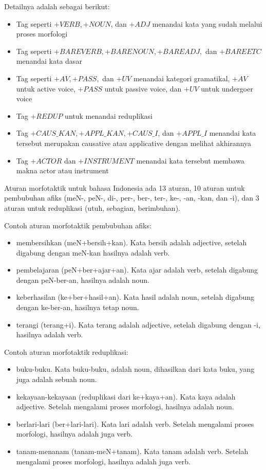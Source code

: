 Detailnya adalah sebagai berikut:
	\begin{itemize}
		\item Tag seperti $+VERB, +NOUN$, dan $+ADJ$ menandai kata yang sudah melalui proses morfologi
		\item Tag seperti $+BAREVERB, +BARENOUN, +BAREADJ,$ dan $+BAREETC$ menandai kata dasar
		\item Tag seperti $+AV, +PASS,$ dan $+UV$ menandai kategori gramatikal, $+AV$ untuk active voice, $+PASS$ untuk passive voice, dan $+UV$ untuk undergoer voice
		\item Tag $+REDUP$ untuk menandai reduplikasi
		\item Tag $+CAUS\_KAN, +APPL\_KAN, +CAUS\_I$, dan $+APPL\_I$ menandai kata tersebut merupakan causative atau applicative dengan melihat akhirannya
		\item Tag $+ACTOR$ dan $+INSTRUMENT$ menandai kata tersebut membawa makna actor atau instrument
	\end{itemize}
	
Aturan morfotaktik untuk bahasa Indonesia ada 13 aturan, 10 aturan untuk pembubuhan afiks (meN-, peN-, di-, per-, ber-, ter-, ke-, -an, -kan, dan -i), dan 3 aturan untuk reduplikasi (utuh, sebagian, berimbuhan).

Contoh aturan morfotaktik pembubuhan afiks:
	\begin{itemize}
		\item membersihkan (meN+bersih+kan). Kata bersih adalah adjective, setelah digabung dengan meN-kan hasilnya adalah verb.
		\item pembelajaran (peN+ber+ajar+an). Kata ajar adalah verb, setelah digabung dengan peN-ber-an, hasilnya adalah noun.
		\item keberhasilan (ke+ber+hasil+an). Kata hasil adalah noun, setelah digabung dengan ke-ber-an, hasilnya tetap noun.
		\item terangi (terang+i). Kata terang adalah adjective, setelah digabung dengan -i, hasilnya adalah verb.
	\end{itemize}

Contoh aturan morfotaktik reduplikasi:
	\begin{itemize}
\item buku-buku. Kata buku-buku, adalah noun, dihasilkan dari kata buku, yang juga adalah sebuah noun.
\item kekayaan-kekayaan (reduplikasi dari ke+kaya+an). Kata kaya adalah adjective. Setelah mengalami proses morfologi, hasilnya adalah noun.
\item berlari-lari (ber+lari-lari). Kata lari adalah verb. Setelah mengalami proses morfologi, hasilnya adalah juga verb.
\item tanam-menanam (tanam-meN+tanam). Kata tanam adalah verb. Setelah mengalami proses morfologi, hasilnya adalah juga verb.
	\end{itemize}

